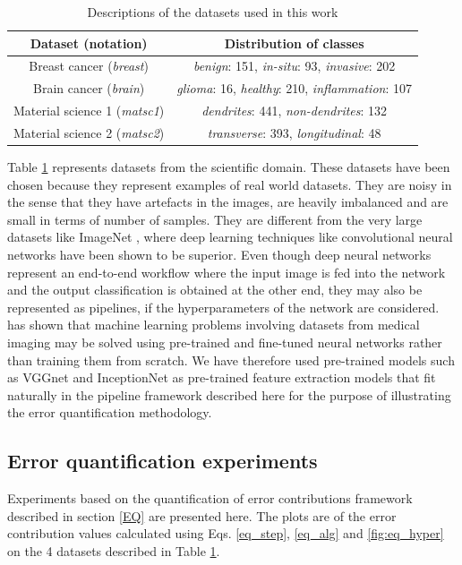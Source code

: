 \begin{table}[ht!]
\centering
\caption{Descriptions of the datasets used in this work}
\begin{tabular}{ |c|c| } 
 \hline
 Dataset (notation) & Distribution of classes \\ 
 \hline
 Breast cancer (\textit{breast}) \cite{bilgin2007cell} & \textit{benign}: 151, \textit{in-situ}: 93, \textit{invasive}: 202\\
 \hline
 Brain cancer (\textit{brain}) \cite{gunduz2004cell} & \textit{glioma}: 16, \textit{healthy}: 210, \textit{inflammation}: 107\\
 \hline
  Material science 1 (\textit{matsc1}) \cite{chowdhury2016image} & \textit{dendrites}: 441, \textit{non-dendrites}: 132 \\
 \hline
 Material science 2 (\textit{matsc2}) \cite{chowdhury2016image} & \textit{transverse}: 393, \textit{longitudinal}: 48 \\
 \hline
 \end{tabular}
\label{table:datasets}
\end{table}
Table \ref{table:datasets} represents datasets from the scientific domain. These datasets have been chosen because they represent examples of real world datasets. They are noisy in the sense that they have artefacts in the images, are heavily imbalanced and are small in terms of number of samples. They are different from the very large datasets like ImageNet \cite{deng2009imagenet}, where deep learning techniques like convolutional neural networks have been shown to be superior. Even though deep neural networks represent an end-to-end workflow where the input image is fed into the network and the output classification is obtained at the other end, they may also be represented as pipelines, if the hyperparameters of the network are considered. \cite{shin2016deep} has shown that machine learning problems involving datasets from medical imaging may be solved using pre-trained and fine-tuned neural networks rather than training them from scratch. We have therefore used pre-trained models such as VGGnet \cite{simonyan2014very} and InceptionNet \cite{szegedy2016rethinking} as pre-trained feature extraction models that fit naturally in the pipeline framework described here for the purpose of illustrating the error quantification methodology.

\subsection{Error quantification experiments}
\label{eq_expts}
Experiments based on the quantification of error contributions framework described in section \ref{EQ} are presented here. The plots are of the error contribution values calculated using Eqs. \ref{eq_step}, \ref{eq_alg} and \ref{fig:eq_hyper} on the 4 datasets described in Table \ref{table:datasets}. 
